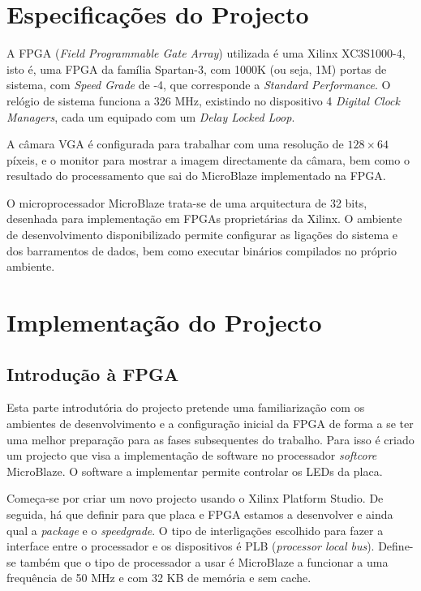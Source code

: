 \documentclass[a4paper]{article}
\begin{document}
\section{Especificações do Projecto}

A FPGA (\textit{Field Programmable Gate Array}) utilizada é uma Xilinx XC3S1000-4, isto é, uma FPGA da família Spartan-3, com 1000K (ou seja, 1M) portas de sistema, com \textit{Speed Grade} de -4, que corresponde a \textit{Standard Performance}. O relógio de sistema funciona a 326 MHz, existindo no dispositivo 4 \textit{Digital Clock Managers}, cada um equipado com um \textit{Delay Locked Loop}\cite{bib:s3datasheet}.

A câmara VGA é configurada para trabalhar com uma resolução de $128\times64$ píxeis, e o monitor para mostrar a imagem directamente da câmara, bem como o resultado do processamento que sai do MicroBlaze implementado na FPGA.

O microprocessador MicroBlaze trata-se de uma arquitectura de 32 bits, desenhada para implementação em FPGAs proprietárias da Xilinx\textregistered\cite{bib:microblaze}. O ambiente de desenvolvimento disponibilizado permite configurar as ligações do sistema e dos barramentos de dados, bem como executar binários compilados no próprio ambiente.

\section{Implementação do Projecto}
\subsection{Introdução à FPGA}
\label{subsec:LEDs}

Esta parte introdutória do projecto pretende uma familiarização com os ambientes de desenvolvimento e a configuração inicial da FPGA de forma a se ter uma melhor preparação para as fases subsequentes do trabalho. Para isso é criado um projecto que visa a implementação de software no processador \textit{softcore} MicroBlaze. O software a implementar permite controlar os LEDs da placa.

Começa-se por criar um novo projecto usando o Xilinx Platform Studio. De seguida, há que definir para que placa e FPGA estamos a desenvolver e ainda qual a \textit{package} e o \textit{speedgrade}. O tipo de interligações escolhido para fazer a interface entre o processador e os dispositivos é PLB (\textit{processor local bus}). Define-se também que o tipo de processador a usar é MicroBlaze a funcionar a uma frequência de 50 MHz e com 32 KB de memória e sem cache.
\end{document}
